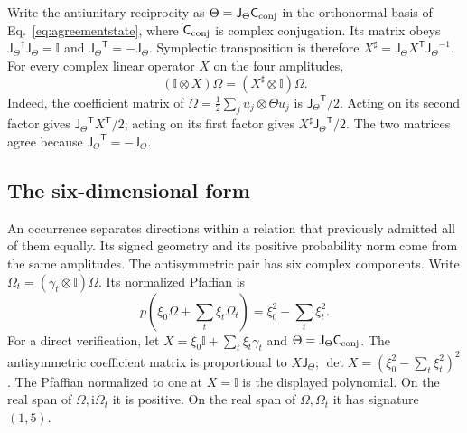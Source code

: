 \documentclass[aps,prx,onecolumn,10pt,notitlepage,nofootinbib,longbibliography]{revtex4-2}
\numberwithin{equation}{section}
\numberwithin{table}{section}
\newcommand{\Id}{\mathbb I}
\newcommand{\ii}{\mathrm i}
\begin{document}
Write the antiunitary reciprocity as $\Theta={\mathsf J_\Theta}{\mathsf C_{\rm conj}}$ in the orthonormal
basis of Eq.~\eqref{eq:agreementstate}, where ${\mathsf C_{\rm conj}}$ is complex conjugation.
Its matrix obeys ${\mathsf J_\Theta}^\dagger {\mathsf J_\Theta}=\Id$ and ${\mathsf J_\Theta}^{\mathsf T}=-{\mathsf J_\Theta}$.
Symplectic transposition is therefore
$X^\sharp={\mathsf J_\Theta}X^{\mathsf T}{\mathsf J_\Theta}^{-1}$. For every complex linear operator $X$
on the four amplitudes,
\begin{equation}
 (\Id\otimes X)\Omega=(X^\sharp\otimes\Id)\Omega.
 \label{eq:crossingidentity}
\end{equation}
Indeed, the coefficient matrix of
$\Omega=\tfrac12\sum_j u_j\otimes\Theta u_j$ is
${\mathsf J_\Theta}^{\mathsf T}/2$. Acting on its second factor gives
${\mathsf J_\Theta}^{\mathsf T}X^{\mathsf T}/2$; acting on its first factor gives
$X^\sharp {\mathsf J_\Theta}^{\mathsf T}/2$. The two matrices agree because
${\mathsf J_\Theta}^{\mathsf T}=-{\mathsf J_\Theta}$.

\subsection{The six-dimensional form}
An occurrence separates directions within a relation that previously admitted all of them equally. Its signed geometry and its positive probability norm come from the same amplitudes. The antisymmetric pair has six complex components. Write $\Omega_t=(\gamma_t\otimes\Id)\Omega$. Its normalized Pfaffian is
\begin{equation}
 p\left(\xi_0\Omega+\sum_t \xi_t\Omega_t\right)=\xi_0^2-\sum_t \xi_t^2.
 \label{eq:pfaffiansi}
\end{equation}
For a direct verification, let $X=\xi_0\Id+\sum_t \xi_t\gamma_t$ and $\Theta={\mathsf J_\Theta}{\mathsf C_{\rm conj}}$. The antisymmetric coefficient matrix is proportional to $X{\mathsf J_\Theta}$; $\det X=(\xi_0^2-\sum_t \xi_t^2)^2$. The Pfaffian normalized to one at $X=\Id$ is the displayed polynomial. On the real span of $\Omega,\ii\Omega_t$ it is positive. On the real span of $\Omega,\Omega_t$ it has signature $(1,5)$.
\end{document}
